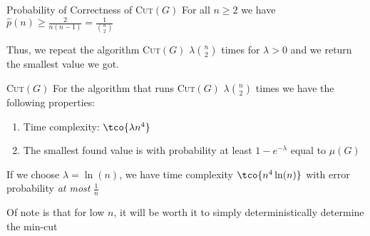 \begin{lemma}[]{Probability of Correctness of \textsc{Cut}$(G)$}
    For all $n \geq 2$ we have $\displaystyle \hat{p}(n) \geq \frac{2}{n(n - 1)} = \frac{1}{{n \choose 2}}$
\end{lemma}
Thus, we repeat the algorithm \textsc{Cut}$(G)$ $\lambda {n \choose 2}$ times for $\lambda > 0$ and we return the smallest value we got.
\begin{theorem}[]{\textsc{Cut}$(G)$}
    For the algorithm that runs \textsc{Cut}$(G)$ $\lambda{n \choose 2}$ times we have the following properties:
    \begin{enumerate}[label=(\arabic*)]
        \item Time complexity: $\tco{\lambda n^4}$
        \item The smallest found value is with probability at least $1 - e^{-\lambda}$ equal to $\mu(G)$
    \end{enumerate}
\end{theorem}
If we choose $\lambda = \ln(n)$, we have time complexity $\tco{n^4 \ln(n)}$ with error probability \textit{at most} $\frac{1}{n}$

Of note is that for low $n$, it will be worth it to simply deterministically determine the min-cut
